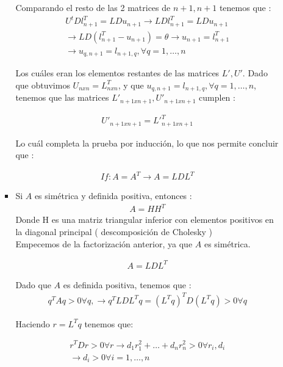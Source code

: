 \documentclass{article}
\begin{document}
\begin{enumerate}
\begin{itemize}
\begin{itemize}
Comparando el resto de las 2 matrices de $n+1,n+1$ tenemos que :
\begin{gather*}
U^{t}Dl^{T}_{n+1} = LDu_{n+1} \rightarrow LDl^{T}_{n+1} = LDu_{n+1}\\
\rightarrow
LD(l^{T}_{n+1} - u_{n+1}) = \theta \rightarrow u_{n+1} = l^{T}_{n+1} \\
\rightarrow u_{q,n+1} = l_{n+1,q}, \forall q=1,\hdots,n
\end{gather*}

Los cu\'ales eran los elementos restantes de las matrices $L',U'$. Dado que obtuvimos $U_{nxn} = L^{T}_{nxn}$, y que $u_{q,n+1} = l_{n+1,q}, \forall q=1,\hdots,n$, tenemos que las matrices $L'_{n+1xn+1}, U'_{n+1xn+1}$ cumplen :

\begin{gather*}
U'_{n+1xn+1} = L'^{T}_{n+1xn+1}
\end{gather*}

Lo cu\'al completa la prueba por inducci\'on, lo que nos permite concluir que :

\begin{gather*}
If : A=A^{T} \rightarrow A=LDL^{T}
\end{gather*}



\item Si $A$ es sim\'etrica y definida positiva, entonces :
\begin{gather*}
A=HH^{T}
\end{gather*} %
Donde H es una matriz triangular inferior con elementos positivos en la diagonal principal ( descomposici\'on de Cholesky )\\

Empecemos de la factorizaci\'on anterior, ya que $A$ es sim\'etrica.

\begin{gather*}
A = LDL^{T}
\end{gather*}

Dado que $A$ es definida positiva, tenemos que :
\begin{gather*}
q^{T}Aq > 0 \forall q, \rightarrow q^{T}LDL^{T}q = (L^{T}q)^{T}D(L^{T}q) > 0 \forall q
\end{gather*}

Haciendo $r = L^{T}q$ tenemos que:

\begin{gather*}
r^{T}Dr > 0 \forall r \rightarrow d_{1}r^{2}_{1} + \hdots + d_{n}r^{2}_{n} > 0 \forall r_{i},d_{i}\\
\rightarrow d_{i} > 0 \forall i=1,\hdots,n
\end{gather*}


\end{itemize}
\end{itemize}
\end{enumerate}
\end{document}
